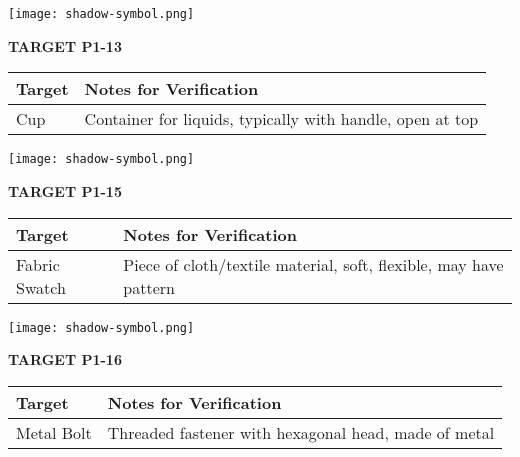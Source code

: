\documentclass[10pt,twoside,final]{book} %
\makeatletter
\newcommand{\cleardoublepageWithSymbol}{%
  \clearpage %
  \if@twoside %
    \ifodd\c@page %
    \else %
      \thispagestyle{fancy} %
      \begingroup %
        \vspace*{0pt} %
        \vfill %
        \centering %
        \noindent 
        \texttt{[image: shadow-symbol.png]}
        \vfill %
      \endgroup
      \newpage    %
      \if@twocolumn\if@firstcolumn\else\hbox{}\newpage\fi\fi
    \fi
  \fi
}
\makeatother
\begin{document}
\cleardoublepageWithSymbol
\label{target:P1-13}
\begin{center}
\Large\textbf{TARGET P1-13}
\end{center}
\begin{mdframed}[backgroundcolor=white, linewidth=0.7pt, linecolor=rvprimary, shadow=true, shadowsize=1pt, shadowcolor=graydark!40, roundcorner=3pt]
\begin{tabular}{|p{3.5cm}|p{9cm}|}
\hline
\rowcolor{rvprimary!15}
\textbf{Target} & \textbf{Notes for Verification} \\
\hline
Cup & Container for liquids, typically with handle, open at top \\
\hline
\end{tabular}
\end{mdframed}


\cleardoublepageWithSymbol
\label{target:P1-15}
\begin{center}
\Large\textbf{TARGET P1-15}
\end{center}
\begin{mdframed}[backgroundcolor=white, linewidth=0.7pt, linecolor=rvprimary, shadow=true, shadowsize=1pt, shadowcolor=graydark!40, roundcorner=3pt]
\begin{tabular}{|p{3.5cm}|p{9cm}|}
\hline
\rowcolor{rvprimary!15}
\textbf{Target} & \textbf{Notes for Verification} \\
\hline
Fabric Swatch & Piece of cloth/textile material, soft, flexible, may have pattern \\
\hline
\end{tabular}
\end{mdframed}


\cleardoublepageWithSymbol
\label{target:P1-16}
\begin{center}
\Large\textbf{TARGET P1-16}
\end{center}
\begin{mdframed}[backgroundcolor=white, linewidth=0.7pt, linecolor=rvprimary, shadow=true, shadowsize=1pt, shadowcolor=graydark!40, roundcorner=3pt]
\begin{tabular}{|p{3.5cm}|p{9cm}|}
\hline
\rowcolor{rvprimary!15}
\textbf{Target} & \textbf{Notes for Verification} \\
\hline
Metal Bolt & Threaded fastener with hexagonal head, made of metal \\
\hline
\end{tabular}
\end{mdframed}
\end{document}
